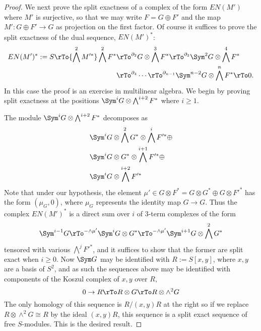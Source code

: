 \begin{proof}
We next prove the split exactness of a complex of the form $EN(M')$ where $M'$ is surjective, so that we
may write $F = G\oplus F'$ and the map $M': G\oplus F' \to G$ as projection on the first factor. 
Of course
it suffices to prove the split exactness of the dual sequence, $EN(M')^*$:
\begin{align*}
EN(M')^* := 
S \rTo{\bigwedge^2 M'^*} 
 \bigwedge^2 F^*&
 \rTo^{\partial_{2}}
 G\otimes \bigwedge^3 F^*  
 \rTo^{\partial_{3}}
  \Sym^2G\otimes\bigwedge^4F^*  \\
 &\rTo^{\partial_{4}}\cdots\rTo^{\partial_{n-1}} 
\Sym^{n-2}G\otimes\bigwedge^nF^* 
 \rTo 0.
\end{align*}
In this case the proof
is an exercise in multilinear algebra. 
We begin by proving split exactness at the 
positions $\Sym^{i} G \otimes \bigwedge^{i+2}  F^*$ where $i\geq 1$.

The module
$ \Sym^{i} G \otimes \bigwedge^{i+2}  F^*$
decomposes as
\begin{align*}
&\Sym^{i} G \otimes \bigwedge^2 G^* \otimes \bigwedge^{i} F'^*\oplus \\
&\Sym^{i} G \otimes  G^*\otimes \bigwedge^{i+1} F'^* \oplus \\
&\Sym^{i} G \otimes  \bigwedge^{i+2} F'^* 
\end{align*}
Note that under our hypothesis, the element $\mu' \in G\otimes F^* = G\otimes G^* \oplus G\otimes F'^*$
has the form $(\mu_G, 0)$, where $\mu_G$ represents the identity map $G \to G$. Thus the complex
$EN(M')^*$ is a direct sum over $i$ of 3-term complexes of the form
$$
\Sym^{i-1} G 
\rTo^{-\wedge \mu'} 
\Sym^{i} G \otimes  G^*
\rTo^{-\wedge \mu'} 
\Sym^{i+1} G \otimes \bigwedge^2 G^* 
$$
tensored with various $\bigwedge^j F'^*$, and it suffices to show that the former are split exact when
$i\geq 0$. Now $\Sym G$ may be identified with $R:= S[x,y]$, where $x,y$ are a basis of $S^2$, and
as such the sequences above may be identified with components of the Koszul complex of $x,y$ over $R$,
$$
0\to R \rTo R\otimes G \rTo R\otimes \wedge^2 G
$$
The only homology of this sequence is $R/(x,y)R$ at the right so if we replace  $R\otimes \wedge^2 G \cong R$ by the ideal $(x,y)R$, this sequence is a split exact sequence of free $S$-modules. This is the desired result.


\end{proof}
